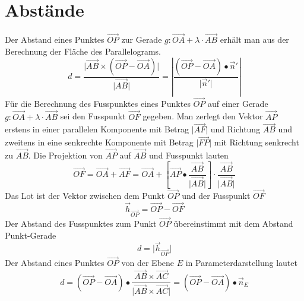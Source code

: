 \section{Abstände}
Der Abstand eines Punktes $\overrightarrow{OP}$ zur Gerade $g:\overrightarrow{OA}+\lambda\cdot \overrightarrow{AB}$ erhält man aus der Berechnung der Fläche des Parallelograms.
\begin{equation}
\boxed{d=\dfrac{\Big\vert\overrightarrow{AB}\times\left(\overrightarrow{OP}-\overrightarrow{OA}\right)\Big\vert}{\Big\vert\overrightarrow{AB}\Big\vert}=\left\vert\dfrac{\left(\overrightarrow{OP}-\overrightarrow{OA}\right)\bullet \overrightarrow{n}'}{\Big\vert\overrightarrow{n}'\Big\vert}\right\vert}
\end{equation}
Für die Berechnung des Fusspunktes eines Punktes $\overrightarrow{OP}$ auf einer Gerade $g:\overrightarrow{OA}+\lambda\cdot \overrightarrow{AB}$ sei den Fusspunkt $\overrightarrow{OF}$ gegeben. Man zerlegt den Vektor $\overrightarrow{AP}$ erstens in einer parallelen Komponente mit Betrag $\Big\vert\overrightarrow{AF}\Big\vert$ und Richtung $\overrightarrow{AB}$ und zweitens in eine senkrechte Komponente mit Betrag $\Big\vert\overrightarrow{FP}\Big\vert$ mit Richtung senkrecht zu $\overrightarrow{AB}$.
\newline\newline
Die Projektion von $\overrightarrow{AP}$ auf $\overrightarrow{AB}$ und Fusspunkt lauten
\begin{equation}
\boxed{\overrightarrow{OF}=\overrightarrow{OA}+\overrightarrow{AF}=\overrightarrow{OA}+\left[\overrightarrow{AP}\bullet \dfrac{\overrightarrow{AB}}{\Big\vert\overrightarrow{AB}\Big\vert}\right]\cdot \dfrac{\overrightarrow{AB}}{\Big\vert\overrightarrow{AB}\Big\vert}}
\end{equation}
Das Lot ist der Vektor zwischen dem Punkt $\overrightarrow{OP}$ und der Fusspunkt $\overrightarrow{OF}$
\begin{equation}
\boxed{\overrightarrow{h}_{\overrightarrow{OP}}=\overrightarrow{OP}-\overrightarrow{OF}}
\end{equation}
Der Abstand des Fusspunktes zum Punkt $\overrightarrow{OP}$ übereinstimmt mit dem Abstand Punkt-Gerade
\begin{equation}
\boxed{d=\Big\vert\overrightarrow{h}_{\overrightarrow{OP}}\Big\vert}
\end{equation}
Der Abstand eines Punktes $\overrightarrow{OP}$ von der Ebene $E$ in Parameterdarstellung lautet
\begin{equation}
\boxed{d=\left(\overrightarrow{OP}-\overrightarrow{OA}\right)\bullet \dfrac{\overrightarrow{AB}\times \overrightarrow{AC}}{\Big\vert\overrightarrow{AB}\times \overrightarrow{AC}\Big\vert}=\left(\overrightarrow{OP}-\overrightarrow{OA}\right)\bullet \overrightarrow{n}_E}
\end{equation}
